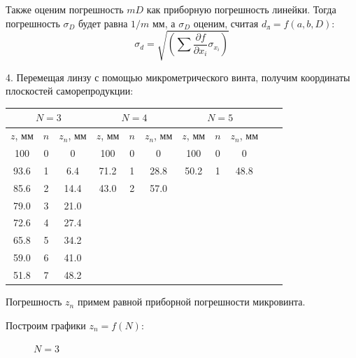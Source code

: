 \documentclass[14pt]{article}
\begin{document}
Также оценим погрешность $mD$ как приборную погрешность линейки. Тогда погрешность $\sigma_D$ будет равна $1/m$ мм, а $\sigma_D$ оценим, считая $d_\text{л} = f(a,b,D)$:
$$
	\sigma_d = \sqrt{\left(\sum \frac{\partial f}{\partial x_i}\sigma_{x_i}\right)}
$$

4. Перемещая линзу с помощью микрометрического винта, получим координаты плоскостей саморепродукции:

\begin{center}
\begin{tabular}{|c|c|c|c|c|c|c|c|c|c|c|}
\hline
\multicolumn{3}{|c|}{$N = 3$}	&	\multicolumn{3}{|c|}{$N = 4$}	&	\multicolumn{3}{|c|}{$N = 5$}		\\
\hline
$z$, мм	&	$n$	&	$z_n$, мм	&	$z$, мм	&	$n$	&	$z_n$, мм	&	$z$, мм	&	$n$	&	$z_n$, мм		\\
\hline
100		&	0	&	0			&	100		&	0	&	0			&	100		&	0	&	0				\\
\hline
93.6	&	1	&	6.4			&	71.2	&	1	&	28.8		&	50.2	&	1	&	48.8			\\
\hline
85.6	&	2	&	14.4		&	43.0	&	2	&	57.0		&			&		&					\\
\hline
79.0	&	3	&	21.0		&			&		&				&			&		&					\\
\hline
72.6	&	4	&	27.4		&			&		&				&			&		&					\\
\hline
65.8	&	5	&	34.2		&			&		&				&			&		&					\\
\hline
59.0	&	6	&	41.0		&			&		&				&			&		&					\\
\hline
51.8	&	7	&	48.2		&			&		&				&			&		&					\\
\hline
\end{tabular}
\end{center}

Погрешность $z_n$ примем равной приборной погрешности микровинта.

\newpage
Построим графики $z_n = f(N)$:

\begin{figure}[h!]
\centering
{}
\captionsetup{labelformat=empty}
\caption{$N = 3$}
\end{figure}
\end{document}
